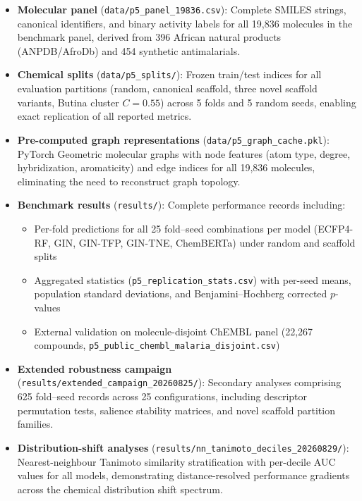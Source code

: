 \documentclass[11pt,a4paper]{article}
\begin{document}
\begin{itemize}[leftmargin=*,itemsep=0.5em]
\item \textbf{Molecular panel} (\texttt{data/p5\_panel\_19836.csv}): Complete SMILES strings, canonical identifiers, and binary activity labels for all 19,836 molecules in the benchmark panel, derived from 396 African natural products (ANPDB/AfroDb) and 454 synthetic antimalarials.

\item \textbf{Chemical splits} (\texttt{data/p5\_splits/}): Frozen train/test indices for all evaluation partitions (random, canonical scaffold, three novel scaffold variants, Butina cluster $C=0.55$) across 5 folds and 5 random seeds, enabling exact replication of all reported metrics.

\item \textbf{Pre-computed graph representations} (\texttt{data/p5\_graph\_cache.pkl}): PyTorch Geometric molecular graphs with node features (atom type, degree, hybridization, aromaticity) and edge indices for all 19,836 molecules, eliminating the need to reconstruct graph topology.

\item \textbf{Benchmark results} (\texttt{results/}): Complete performance records including:
\begin{itemize}
\item Per-fold predictions for all 25 fold--seed combinations per model (ECFP4-RF, GIN, GIN-TFP, GIN-TNE, ChemBERTa) under random and scaffold splits
\item Aggregated statistics (\texttt{p5\_replication\_stats.csv}) with per-seed means, population standard deviations, and Benjamini--Hochberg corrected $p$-values
\item External validation on molecule-disjoint ChEMBL panel (22,267 compounds, \texttt{p5\_public\_chembl\_malaria\_disjoint.csv})
\end{itemize}

\item \textbf{Extended robustness campaign} (\texttt{results/extended\_campaign\_20260825/}): Secondary analyses comprising 625 fold--seed records across 25 configurations, including descriptor permutation tests, salience stability matrices, and novel scaffold partition families.

\item \textbf{Distribution-shift analyses} (\texttt{results/nn\_tanimoto\_deciles\_20260829/}): Nearest-neighbour Tanimoto similarity stratification with per-decile AUC values for all models, demonstrating distance-resolved performance gradients across the chemical distribution shift spectrum.


\end{itemize}
\end{document}
